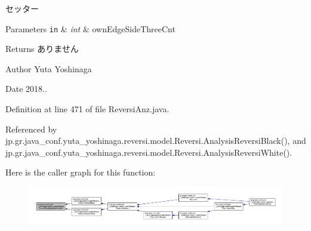 セッター 


\begin{DoxyParams}[1]{Parameters}
\mbox{\tt in}  & {\em int} & own\+Edge\+Side\+Three\+Cnt \\
\hline
\end{DoxyParams}
\begin{DoxyReturn}{Returns}
ありません 
\end{DoxyReturn}
\begin{DoxyAuthor}{Author}
Yuta Yoshinaga 
\end{DoxyAuthor}
\begin{DoxyDate}{Date}
2018.. 
\end{DoxyDate}


Definition at line 471 of file Reversi\+Anz.\+java.



Referenced by jp.\+gr.\+java\+\_\+conf.\+yuta\+\_\+yoshinaga.\+reversi.\+model.\+Reversi.\+Analysis\+Reversi\+Black(), and jp.\+gr.\+java\+\_\+conf.\+yuta\+\_\+yoshinaga.\+reversi.\+model.\+Reversi.\+Analysis\+Reversi\+White().

Here is the caller graph for this function\+:
\nopagebreak
\begin{figure}[H]
\begin{center}
\leavevmode
\includegraphics[width=350pt]{classjp_1_1gr_1_1java__conf_1_1yuta__yoshinaga_1_1reversi_1_1model_1_1_reversi_anz_a0ce858afa1508c93ca52c33fa4eb2f32_icgraph}
\end{center}
\end{figure}
\mbox{\label{classjp_1_1gr_1_1java__conf_1_1yuta__yoshinaga_1_1reversi_1_1model_1_1_reversi_anz_a2275456b67f846c90e37b8e726b46aa6}} 
